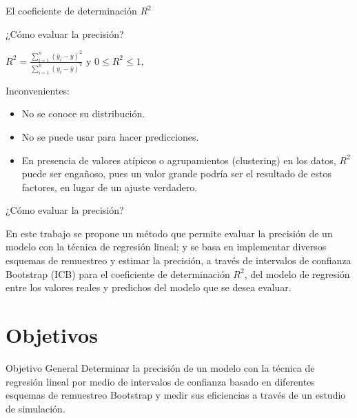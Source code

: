 \documentclass[serif, aspectratio=169]{beamer}
\begin{document}
\begin{frame}{El coeficiente de determinación $R^2$}
	
	\begin{exampleblock}{¿Cómo evaluar la precisión?}
	\end{exampleblock}	


	\begin{center}
	{\Large $R^{2} = \frac{ \sum_{i=1}^{n} ( \hat{y}_{i} - \bar{y})^{2}} { \sum_{i=1}^{n} ( y_{i} - \bar{y})^{2}  }$ }  y  $ 0 \leq R^{2} \leq 1$,
	\end{center}
	
	\vspace{0.3cm}
	
	Inconvenientes:
	\begin{itemize}
		\item No se conoce su distribución.
		\item No se puede usar para hacer predicciones.
		\item En presencia de valores atípicos o agrupamientos (clustering) en los datos, $R^{2}$ puede ser engañoso, pues un valor grande podría ser el resultado de estos factores, en lugar de un ajuste verdadero.
	\end{itemize}

\end{frame}




\begin{frame}{¿Cómo evaluar la precisión?}
	
\begin{center}
		En este trabajo se propone un método que permite evaluar la precisión de un modelo con la técnica de regresión lineal; y se basa en implementar diversos esquemas de remuestreo y estimar la precisión, a través de intervalos de confianza Bootstrap (ICB) para el coeficiente de determinación $R^2$, del modelo de regresión entre los valores reales y predichos del modelo que se desea evaluar.\
\end{center}
	
\end{frame}





\section{Objetivos}

\begin{frame}{Objetivo General}
Determinar la precisión de un modelo con la técnica de regresión lineal por medio de intervalos de confianza basado en diferentes esquemas de remuestreo Bootstrap y medir sus eficiencias a través de un estudio de simulación.
\end{frame}
\end{document}
